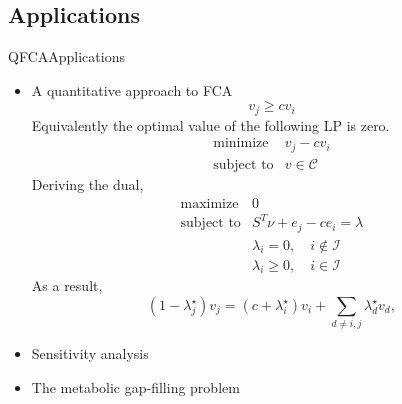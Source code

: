 \documentclass[10pt]{beamer}
\theoremstyle{remark}
\theoremstyle{definition}
\begin{document}
\subsection{Applications}
\begin{frame}{QFCA}{Applications}
	\begin{itemize}
		\item A quantitative approach to FCA
		\[
		v_j \geq c v_i
		\]\pause
		Equivalently the optimal value of the following LP is zero.
		\[
		\begin{array}{ll}
			\mbox{minimize}		& v_j - c v_i \\
			\mbox{subject to}	& v \in \mathcal{C}
		\end{array}
		\]\pause
		Deriving the dual,
		\[
		\begin{array}{ll}
			\mbox{maximize}		& 0 \\
			\mbox{subject to}	& S^T \nu + e_j - c e_i = \lambda \\
								& \lambda_i = 0,\quad i\notin\mathcal{I} \\
								& \lambda_i \geq 0,\quad i\in\mathcal{I}
		\end{array}
		\]\pause
		As a result,
		\[
		(1-\lambda^\star_j)v_j = (c+\lambda^\star_i)v_i + \sum_{d\neq i,j} \lambda^\star_d v_d,
		\]\pause
		\item Sensitivity analysis\pause 
		\item The metabolic gap-filling problem
	\end{itemize}
\end{frame}

\end{document}
